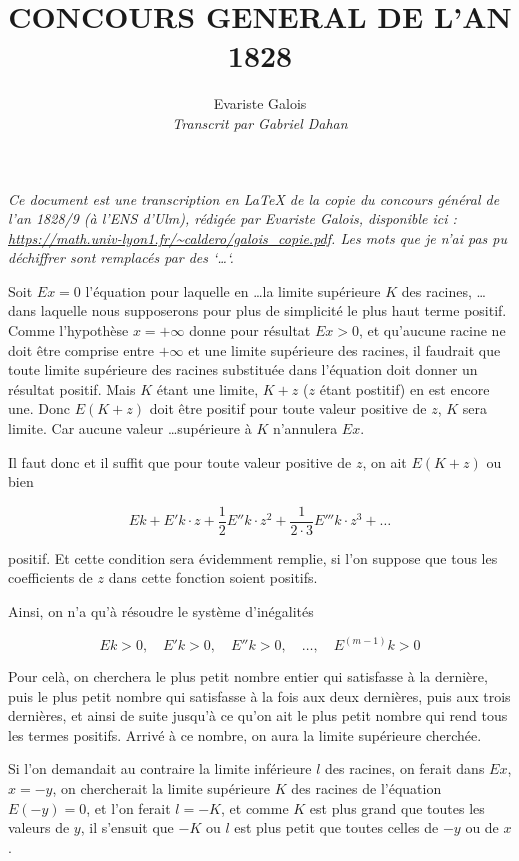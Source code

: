 \documentclass[11pt]{article}
\title{CONCOURS GENERAL DE L'AN 1828}
\author{Evariste Galois \\ \textit{Transcrit par Gabriel Dahan}}
\date{}
\begin{document}
    
\maketitle

\textit{Ce document est une transcription en \LaTeX{} de la copie du concours g\'en\'eral de l'an 1828/9 (à l'ENS d'Ulm), 
r\'edig\'ee par Evariste Galois, disponible ici : \url{https://math.univ-lyon1.fr/~caldero/galois_copie.pdf}.
Les mots que je n'ai pas pu d\'echiffrer sont remplac\'es par des `\dots`.}\newline
\newline
    
\quad{}\newline

Soit $Ex=0$ l'équation pour laquelle en \dots la limite supérieure $K$ des racines, \dots dans
laquelle nous supposerons pour plus de simplicité le plus haut terme positif. Comme 
l'hypothèse $x=+\infty$ donne pour résultat $Ex>0$, et qu'aucune racine ne doit être 
comprise entre $+\infty$ et une limite supérieure des racines, il faudrait que toute limite 
supérieure des racines substituée dans l'équation doit donner un résultat positif. Mais 
$K$ étant une limite, $K+z$ ($z$ étant postitif) en est encore une. Donc $E(K+z)$ doit 
être positif pour toute valeur positive de $z$, $K$ sera limite. Car aucune valeur \dots supérieure à
$K$ n'annulera $Ex$.

Il faut donc et il suffit que pour toute valeur positive de $z$, on ait $E(K+z)$ ou bien 

$$Ek+E'k\cdot z+\frac{1}{2}E''k\cdot z^2+\frac{1}{2\cdot 3}E'''k\cdot z^3+\dots$$

positif. Et cette condition sera évidemment remplie, si l'on suppose que tous les coefficients 
de $z$ dans cette fonction soient positifs.

Ainsi, on n'a qu'à résoudre le système d'inégalités 

$$Ek>0, \quad E'k>0, \quad E''k>0, \quad \dots, \quad E^{(m-1)}k>0$$

Pour celà, on cherchera le plus petit nombre entier qui satisfasse à la dernière, puis
le plus petit nombre qui satisfasse à la fois aux deux dernières, puis aux trois 
dernières, et ainsi de suite jusqu'à ce qu'on ait le plus petit nombre qui rend tous
les termes positifs. Arrivé à ce nombre, on aura la limite supérieure cherchée.

Si l'on demandait au contraire la limite inférieure $l$ des racines, on ferait dans
$Ex$, $x=-y$, on chercherait la limite supérieure $K$ des racines de l'équation
$E(-y)=0$, et l'on ferait $l=-K$, et comme $K$ est plus grand que toutes les valeurs de
$y$, il s'ensuit que $-K$ ou $l$ est plus petit que toutes celles de $-y$ ou de $x$.
\end{document}
